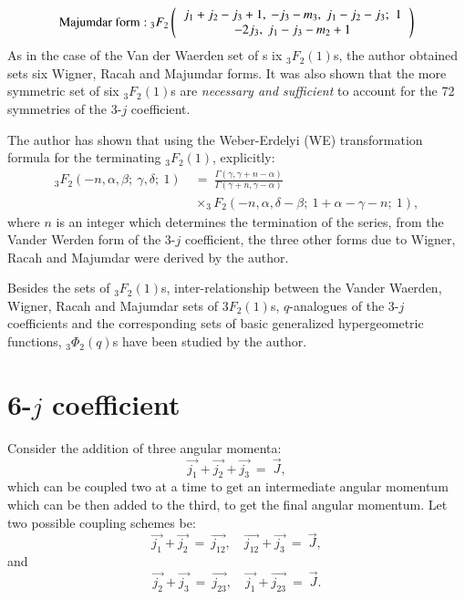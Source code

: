 \smallskip
\begin{equation}
{\rm Majumdar\ form:}\ {}_3F_2
\left(
\begin{tabular}{c}
$j_1+j_2-j_3+1,\ -j_3-m_3,\ j_1-j_2-j_3;$ \ 1\\
$-2j_3,\ j_1-j_3-m_2+1$  \\ 
\end{tabular} 
\right) \label{chap29-eq18}
\end{equation}
As in the case of the Van der Waerden set of s ix $_3F_2(1)$s, the author obtained sets six Wigner, Racah and Majumdar forms. It was also shown that the more symmetric set of six $_3F_2(1)$s are \textit{necessary and sufficient} to account for the 72 symmetries of the 3-$j$ coefficient.

The author has shown that using the Weber-Erdelyi (WE) transformation formula for the terminating $_3F_2(1)$, explicitly:
\begin{equation}
\begin{split}
_3F_2(-n,\alpha,\beta ;\ \gamma,\delta;\ 1)\ & = \ \frac{\Gamma(\gamma, \gamma +n-\alpha )} {\Gamma(\gamma +n, \gamma -\alpha )}\\
& \times _3F_2(-n,\alpha,\delta -\beta;\ 1+\alpha -\gamma -n;\ 1), \label{chap29-eq19}
\end{split}
\end{equation}
where $n$ is an integer which determines the termination of the series, from the Vander Werden form of the 3-$j$ coefficient, the three other forms due to Wigner, Racah and Majumdar were derived by the author.

Besides the sets of $_3F_2(1)$s, inter-relationship between the Vander Waerden, Wigner, Racah and Majumdar sets of $3F_2(1)$s,  $q$-analogues of the 3-$j$ coefficients and the corresponding sets of basic generalized hypergeometric functions, $_3\Phi_2(q)$s have been studied by the author.

\section*{6-$j$ coefficient}

Consider the addition of three angular momenta:
\begin{equation}
\vec{j_1} + \vec{j_2} + \vec{j_3} \ =\ \vec{J}, \label{chap29-eq20}
\end{equation}
which can be coupled two at a time to get an intermediate angular momentum which can be then added to the third, to get the final angular momentum. Let two possible coupling schemes be:
\begin{equation}
\vec{j_1} + \vec{j_2}\ =\ \vec{j_{12}}, \quad  \vec{j_{12}} + \vec{j_3} \ =\ \vec{J}, \label{chap29-eq21}
\end{equation}
and 
\begin{equation}
\vec{j_2} + \vec{j_3}\ =\ \vec{j_{23}}, \quad  \vec{j_1} + \vec{j_{23}} \ =\ \vec{J}. \label{chap29-eq22}
\end{equation}

